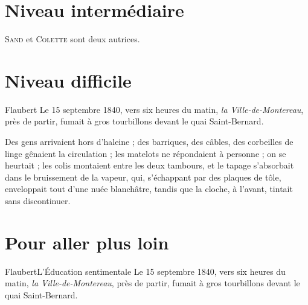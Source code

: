 \documentclass[12pt]{article}
\newcommand{\auteur}[2][]{\ifblank{#1}{}{#1 }\textsc{#2}}
\begin{document}
\section*{Niveau intermédiaire}

\auteur[George]{Sand} et \auteur{Colette} sont deux autrices.


\section*{Niveau difficile}

\begin{extrait}{Flaubert}
	Le 15 septembre 1840, vers six heures du matin, \emph{la Ville-de-Montereau}, près de partir, fumait à gros tourbillons devant le quai Saint-Bernard.

	Des gens arrivaient hors d'haleine ; des barriques, des câbles, des corbeilles de linge gênaient la circulation ; les matelots ne répondaient à personne ; on se heurtait ; les colis montaient entre les deux tambours, et le tapage s'absorbait dans le bruissement de la vapeur, qui, s'échappant par des plaques de tôle, enveloppait tout d'une nuée blanchâtre, tandis que la cloche, à l'avant, tintait sans discontinuer.
\end{extrait}


\section*{Pour aller plus loin}

\begin{Extrait}{Flaubert}{L'Éducation sentimentale}
	Le 15 septembre 1840, vers six heures du matin, \emph{la Ville-de-Montereau}, près de partir, fumait à gros tourbillons devant le quai Saint-Bernard.
\end{Extrait}
\end{document}
